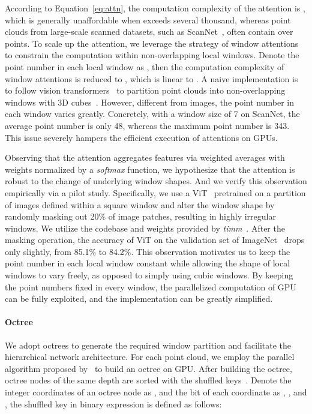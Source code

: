\documentclass[acmtog,screen,authorversion]{acmart}
\begin{document}
According to Equation~\ref{eq:attn}, the computation complexity of the attention is , which is generally unaffordable when  exceeds several thousand, whereas point clouds from large-scale scanned datasets, such as ScanNet~\cite{Dai2017a}, often contain over  points.
To scale up the attention, we leverage the strategy of window attentions~\cite{Liu2021a} to constrain the computation within non-overlapping local windows.
Denote the point number in each local window as , then the computation complexity of window attentions is reduced to , which is linear to .
A naive implementation is to follow vision transformers~\cite{Liu2021a} to partition point clouds into non-overlapping windows with 3D cubes~\cite{Fan2022,Sun2022,Lai2022}.
However, different from images, the point number in each window varies greatly.
Concretely, with a window size of 7 on ScanNet, the average point number is only 48, whereas the maximum point number is 343.
This issue severely hampers the efficient execution of attentions on GPUs.


Observing that the attention aggregates features via weighted averages with weights normalized by a \emph{softmax} function, we hypothesize that the attention is robust to the change of underlying window shapes.
And we verify this observation empirically via a pilot study.
Specifically, we use a ViT~\cite{Dosovitskiy2021} pretrained on a  partition of images defined within a square window and alter the window shape by randomly masking out 20\% of image patches, resulting in highly irregular windows.  We utilize the codebase and weights provided by \emph{timm}~\cite{Wightman2019}.
After the masking operation, the accuracy of ViT on the validation set of ImageNet~\cite{Deng2009} drops only slightly, from 85.1\% to 84.2\%.
This observation motivates us to keep the point number in each local window constant while allowing the shape of local windows to vary freely, as opposed to simply using cubic windows.
By keeping the point numbers fixed in every window, the parallelized computation of GPU can be fully exploited, and the implementation can be greatly simplified.


\paragraph{Octree}
We adopt octrees to generate the required window partition and facilitate the hierarchical network architecture.
For each point cloud, we employ the parallel algorithm proposed by~\cite{Zhou2011} to build an octree on GPU.
After building the octree, octree nodes of the same depth are sorted with the shuffled keys~\cite{Wilhelms1992}.
Denote the integer coordinates of an octree node as , and the  bit of each coordinate as , , and , the shuffled key in binary expression is defined as follows:
\end{document}
